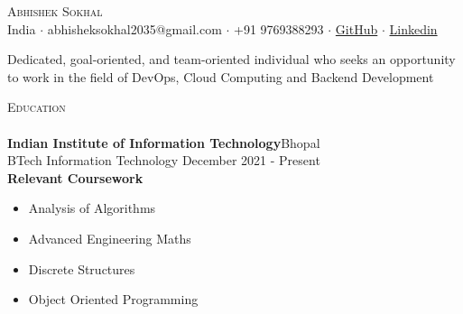 \documentclass[a4paper]{article}
\newcommand{\lineunder} {
    \vspace*{-8pt} \\
    \hspace*{-18pt} \hrulefill \\
}
\newcommand{\header} [1] {
    {\hspace*{-18pt}\vspace*{6pt} \textsc{#1}}
    \vspace*{-6pt} \lineunder
}
\begin{document}
\vspace*{-40pt}

    

\vspace*{-9pt}
\begin{center}
	{\Huge \scshape {Abhishek Sokhal}}\\
	\vspace{2mm}
	India $\cdot$ abhisheksokhal2035@gmail.com $\cdot$ +91 9769388293 $\cdot$ \href{https://github.com/Distroto}{GitHub} $\cdot$ \href{https://www.linkedin.com/in/abhishek-sokhal-630a951ba/}{Linkedin} \\
\end{center}
\begin{center}
Dedicated, goal-oriented, and team-oriented individual who seeks an opportunity to work in the field of DevOps, Cloud Computing and Backend Development\\
\end{center}
\vspace{1mm}
\header{Education}
\vspace{0mm}
\textbf{Indian Institute of Information Technology}\hfill Bhopal\\
BTech Information Technology \hfill December 2021 - Present\\
\vspace{1mm}
\textbf{Relevant Coursework}
\vspace{-2.5mm}
 \begin{multicols}{2}
    \begin{itemize}
        \item Analysis of Algorithms
         \vspace{-2.5mm}
        \item Advanced Engineering Maths 
         \vspace{-2.5mm}
        \item Discrete Structures 
         \vspace{-2.5mm}
        \item Object Oriented Programming
         \vspace{-2.5mm}
        
    \end{itemize}
    \end{multicols}
\end{document}
